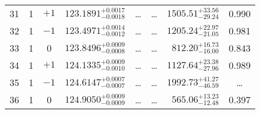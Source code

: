 \begin{table*}[!]
\begin{tabular}{llcrrlrc}
31 & 1 & $+1$ & $    123.1891_{-      0.0018}^{+      0.0017}$ & \multicolumn{1}{c}{\dots} & \multicolumn{1}{c}{\dots} & $     1505.51_{-       29.24}^{+       33.56}$ & 0.990 \\[1pt]
32 & 1 & $-1$ & $    123.4971_{-      0.0012}^{+      0.0014}$ & \multicolumn{1}{c}{\dots} & \multicolumn{1}{c}{\dots} & $     1205.24_{-       21.05}^{+       22.97}$ & 0.981 \\[1pt]
33 & 1 & 0 & $    123.8496_{-      0.0008}^{+      0.0009}$ & \multicolumn{1}{c}{\dots} & \multicolumn{1}{c}{\dots} & $      812.20_{-       16.00}^{+       16.73}$ & 0.843\\[1pt]
34 & 1 & $+1$ & $    124.1335_{-      0.0010}^{+      0.0009}$ & \multicolumn{1}{c}{\dots} & \multicolumn{1}{c}{\dots} & $     1127.64_{-       27.96}^{+       23.38}$ & 0.989 \\[1pt]
35 & 1 & $-1$ & $    124.6147_{-      0.0007}^{+      0.0007}$ & \multicolumn{1}{c}{\dots} & \multicolumn{1}{c}{\dots} & $     1992.73_{-       46.59}^{+       41.27}$ & \dots \\[1pt]
36 & 1 & 0 & $    124.9050_{-      0.0009}^{+      0.0009}$ & \multicolumn{1}{c}{\dots} & \multicolumn{1}{c}{\dots} & $      565.06_{-       12.48}^{+       13.23}$ & 0.397\\[1pt]


\end{tabular}
\end{table*}
